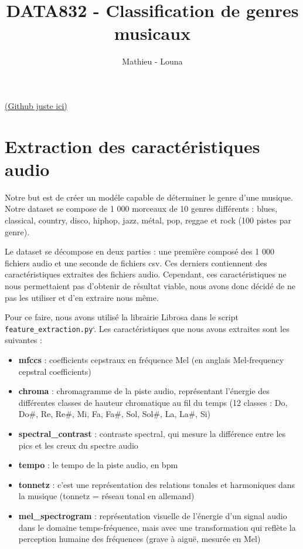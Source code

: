 \documentclass{article}
\title{DATA832 - Classification de genres musicaux}
\author{Mathieu - Louna}
\date{}
\begin{document}
\maketitle

\href{https://github.com/Mathieeeu/data832_projet}{(Github juste ici)}

\section{Extraction des caractéristiques audio}

Notre but est de créer un modéle capable de déterminer le genre d'une musique. Notre dataset se compose de 1 000 morceaux de 10 genres différents : blues, classical, country, disco, hiphop, jazz, métal, pop, reggae et rock (100 pistes par genre).

Le dataset se décompose en deux parties : une première composé des 1 000 fichiers audio et une seconde de fichiers csv. Ces derniers contiennent des caractéristiques extraites des fichiers audio. Cependant, ces caractéristiques ne nous permettaient pas d'obtenir de résultat viable, nous avons donc décidé de ne pas les utiliser et d'en extraire nous même.

Pour ce faire, nous avons utilisé la librairie Librosa dans le script
\texttt{feature\_extraction.py}`. Les caractéristiques que nous avons extraites sont les suivantes :

\begin{itemize}
    \item \textbf{mfccs} : coefficients cepstraux en fréquence Mel (en anglais Mel-frequency cepstral coefficients)
    \item \textbf{chroma} : chromagramme de la piste audio, représentant l'énergie des différentes classes de hauteur chromatique au fil du temps (12 classes : Do, Do\#, Re, Re\#, Mi, Fa, Fa\#, Sol, Sol\#, La, La\#, Si)
    \item \textbf{spectral\_contrast} : contraste spectral, qui mesure la différence entre les pics et les creux du spectre audio
    \item \textbf{tempo} : le tempo de la piste audio, en bpm
    \item \textbf{tonnetz} : c'est une représentation des relations tonales et harmoniques dans la musique (tonnetz = réseau tonal en allemand)
    \item \textbf{mel\_spectrogram} : représentation visuelle de l'énergie d'un signal audio dans le domaine temps-fréquence, mais avec une transformation qui reflète la perception humaine des fréquences (grave à aiguë, mesurée en Mel)
\end{itemize}
\end{document}
